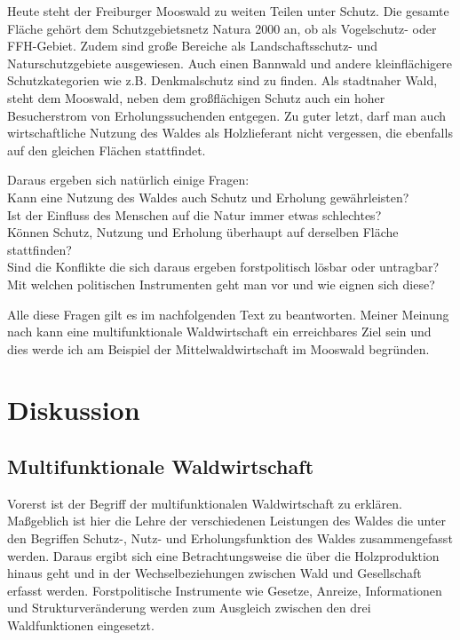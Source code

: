 \documentclass[12pt]{article}
\begin{document}
Heute steht der Freiburger Mooswald zu weiten Teilen unter Schutz. Die gesamte Fläche gehört dem
Schutzgebietsnetz Natura 2000 an, ob als Vogelschutz- oder FFH-Gebiet. Zudem sind große Bereiche
als Landschaftsschutz- und Naturschutzgebiete ausgewiesen. Auch einen Bannwald und andere kleinflächigere
Schutzkategorien wie z.B. Denkmalschutz sind zu finden. Als stadtnaher Wald, steht dem Mooswald, neben dem
großflächigen Schutz auch ein hoher Besucherstrom von Erholungssuchenden entgegen. Zu guter letzt, darf man
auch wirtschaftliche Nutzung des Waldes als Holzlieferant nicht vergessen, die ebenfalls auf den gleichen
Flächen stattfindet.

Daraus ergeben sich natürlich einige Fragen:\\ 
Kann eine Nutzung des Waldes auch Schutz und Erholung gewährleisten? \\
Ist der Einfluss des Menschen auf die Natur immer etwas schlechtes? \\
Können Schutz, Nutzung und Erholung überhaupt auf derselben Fläche stattfinden? \\
Sind die Konflikte die sich daraus ergeben forstpolitisch lösbar oder untragbar? \\
Mit welchen politischen Instrumenten geht man vor und wie eignen sich diese?

Alle diese Fragen gilt es im nachfolgenden Text zu beantworten. 
Meiner Meinung nach kann eine multifunktionale Waldwirtschaft ein erreichbares Ziel sein
und dies werde ich am Beispiel der Mittelwaldwirtschaft im Mooswald begründen. 


\section*{Diskussion}
\subsection*{Multifunktionale Waldwirtschaft}
Vorerst ist der Begriff der multifunktionalen Waldwirtschaft zu erklären. Maßgeblich ist
hier die Lehre der verschiedenen Leistungen des Waldes die unter den Begriffen Schutz-, Nutz-
und Erholungsfunktion des Waldes zusammengefasst werden. Daraus ergibt sich eine Betrachtungsweise
die über die Holzproduktion hinaus geht und in der Wechselbeziehungen zwischen Wald und Gesellschaft
erfasst werden. Forstpolitische Instrumente wie Gesetze, Anreize, Informationen und Strukturveränderung
werden zum Ausgleich zwischen den drei Waldfunktionen eingesetzt. 
\end{document}
